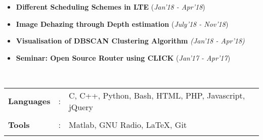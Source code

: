 \documentclass[10pt]{article}
\newcommand\hs{1.3mm}		%
\begin{document}
\colorbox{bl}{}
\vspace{-0.5cm}
\begin{itemize}[leftmargin=0.4cm]

\item \textbf{Different Scheduling Schemes in LTE}
\hfill{(\textit{Jan'18 - Apr'18})}\\\vspace{-0.6cm}

	
\item \textbf{Image Dehazing through Depth estimation}
\hfill{(\textit{July'18 - Nov'18})}\\
\vspace{-0.6cm}

\item \textbf{Visualisation of DBSCAN Clustering Algorithm}
\hfill{\textit{(Jan'18 - Apr'18)}}\\
\vspace{-0.6cm}
    
\item \textbf{Seminar: Open Source Router using CLICK}
\hfill{(\textit{Jan'17 - Apr'17})}\\
\vspace{-0.6cm}

\end{itemize}

\colorbox{bl}{}\\
\begin{tabular}{m{1in}m{0.20in}m{4.5in}}
	\\[-3mm]
	\hspace{\hs} \hspace{0.12cm}\textbf{\textbf{Languages}} &: & {{C, C++, Python, Bash, HTML, PHP, Javascript, jQuery}} \\
	\\[-3.5mm]
	\hspace{\hs} \hspace{0.12cm}\textbf{\textbf{Tools}} &: & {Matlab, GNU Radio, \LaTeX, Git}\\
	\\[-3.5mm]
\end{tabular}\\

	
\end{document}
